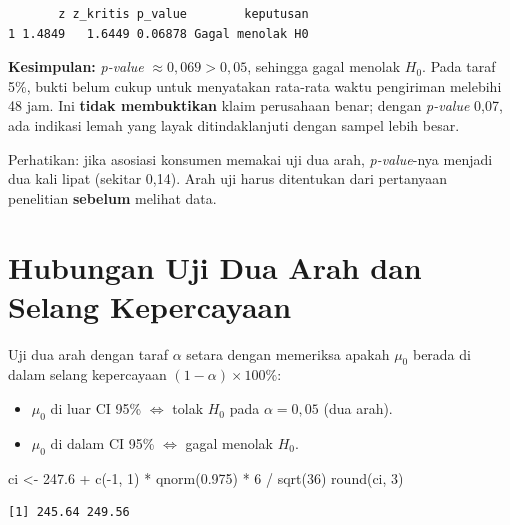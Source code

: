 \documentclass[
  indonesian,
  letterpaper,
]{book}
\newenvironment{Shaded}{\begin{snugshade}}{\end{snugshade}}
\newcommand{\DecValTok}[1]{\textcolor[rgb]{0.68,0.00,0.00}{#1}}
\newcommand{\FloatTok}[1]{\textcolor[rgb]{0.68,0.00,0.00}{#1}}
\newcommand{\FunctionTok}[1]{\textcolor[rgb]{0.28,0.35,0.67}{#1}}
\newcommand{\NormalTok}[1]{\textcolor[rgb]{0.00,0.23,0.31}{#1}}
\newcommand{\OtherTok}[1]{\textcolor[rgb]{0.00,0.23,0.31}{#1}}
\newcommand{\SpecialCharTok}[1]{\textcolor[rgb]{0.37,0.37,0.37}{#1}}
\providecommand{\tightlist}{%
  \setlength{\itemsep}{0pt}\setlength{\parskip}{0pt}}
\begin{document}
\begin{verbatim}
       z z_kritis p_value        keputusan
1 1.4849   1.6449 0.06878 Gagal menolak H0
\end{verbatim}

\textbf{Kesimpulan:} \emph{p-value} \(\approx 0{,}069 > 0{,}05\),
sehingga gagal menolak \(H_0\). Pada taraf 5\%, bukti belum cukup untuk
menyatakan rata-rata waktu pengiriman melebihi 48 jam. Ini \textbf{tidak
membuktikan} klaim perusahaan benar; dengan \emph{p-value} 0,07, ada
indikasi lemah yang layak ditindaklanjuti dengan sampel lebih besar.

Perhatikan: jika asosiasi konsumen memakai uji dua arah,
\emph{p-value}-nya menjadi dua kali lipat (sekitar 0,14). Arah uji harus
ditentukan dari pertanyaan penelitian \textbf{sebelum} melihat data.


\chapter{Hubungan Uji Dua Arah dan Selang
Kepercayaan}\label{hubungan-uji-dua-arah-dan-selang-kepercayaan}

Uji dua arah dengan taraf \(\alpha\) setara dengan memeriksa apakah
\(\mu_0\) berada di dalam selang kepercayaan
\((1-\alpha) \times 100\%\):

\begin{itemize}
\tightlist
\item
  \(\mu_0\) di luar CI 95\% \(\iff\) tolak \(H_0\) pada
  \(\alpha = 0{,}05\) (dua arah).
\item
  \(\mu_0\) di dalam CI 95\% \(\iff\) gagal menolak \(H_0\).
\end{itemize}

\begin{Shaded}
\begin{Highlighting}[]
\NormalTok{ci }\OtherTok{\textless{}{-}} \FloatTok{247.6} \SpecialCharTok{+} \FunctionTok{c}\NormalTok{(}\SpecialCharTok{{-}}\DecValTok{1}\NormalTok{, }\DecValTok{1}\NormalTok{) }\SpecialCharTok{*} \FunctionTok{qnorm}\NormalTok{(}\FloatTok{0.975}\NormalTok{) }\SpecialCharTok{*} \DecValTok{6} \SpecialCharTok{/} \FunctionTok{sqrt}\NormalTok{(}\DecValTok{36}\NormalTok{)}
\FunctionTok{round}\NormalTok{(ci, }\DecValTok{3}\NormalTok{)}
\end{Highlighting}
\end{Shaded}

\begin{verbatim}
[1] 245.64 249.56
\end{verbatim}
\end{document}
